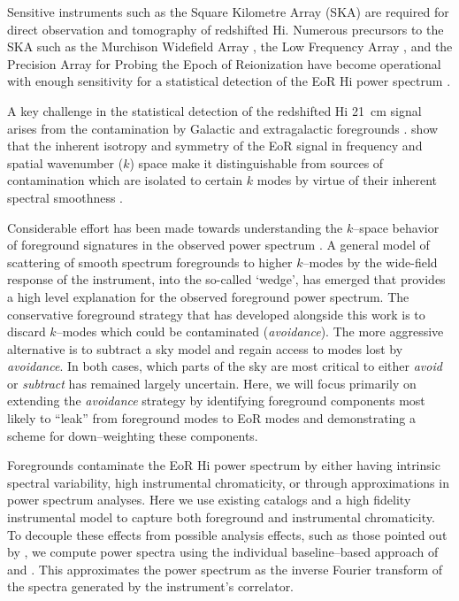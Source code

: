 \documentclass[preprint2,iop,numberedappendix]{emulateapj}
\begin{document}
Sensitive instruments such as the Square Kilometre Array (SKA) are required for direct observation and tomography of redshifted H{\sc i}. Numerous precursors to the SKA such as the Murchison Widefield Array \citep[MWA;][]{tin13,bow13,lon09}, the Low Frequency Array \citep[LOFAR;][]{van13}, and the Precision Array for Probing the Epoch of Reionization \citep[PAPER;][]{par10} have become operational with enough sensitivity for a statistical detection of the EoR H{\sc i} power spectrum \citep{thy13,bea13,bow06,pob14}. 

A key challenge in the statistical detection of the redshifted H{\sc i} 21~cm signal arises from the contamination by Galactic and extragalactic foregrounds \citep[see, e.g.,][]{dim02,zal04,fur06}. \citet{mor04} show that the inherent isotropy and symmetry of the EoR signal in frequency and spatial wavenumber ($k$) space make it distinguishable from sources of contamination which are isolated to certain $k$ modes by virtue of their inherent spectral smoothness \citep{mor06,bow09,liu11,par12,dil13}.

Considerable effort has been made towards understanding the $k$--space behavior of foreground signatures in the observed power spectrum \citep{thy13,pob13,mor12,tro12,liu11,dat10,bow09,liu09}. A general model of scattering of smooth spectrum foregrounds to higher $k$--modes by the wide-field response of the instrument, into the so-called `wedge', has emerged that provides a high level explanation for the observed foreground power spectrum. The conservative foreground strategy that has developed alongside this work is to discard $k$--modes which could be contaminated ({\it avoidance}). The more aggressive alternative is to subtract a sky model and regain access to modes lost by {\it avoidance}. In both cases, which parts of the sky are most critical to either {\it avoid} or {\it subtract} has remained largely uncertain. Here, we will focus primarily on extending the {\it avoidance} strategy by identifying foreground components most likely to ``leak'' from foreground modes to EoR modes and demonstrating a scheme for down--weighting these components.

Foregrounds contaminate the EoR H{\sc i} power spectrum by either having intrinsic spectral variability, high instrumental chromaticity, or through approximations in power spectrum analyses. Here we use existing catalogs and a high fidelity instrumental model to capture both foreground and instrumental chromaticity. To decouple these effects from possible analysis effects, such as those pointed out by \citet{haz13}, we compute power spectra using the individual baseline--based approach of \citet{pob13} and \citet{par14}. This approximates the power spectrum as the inverse Fourier transform of the spectra generated by the instrument's correlator. 
\end{document}
